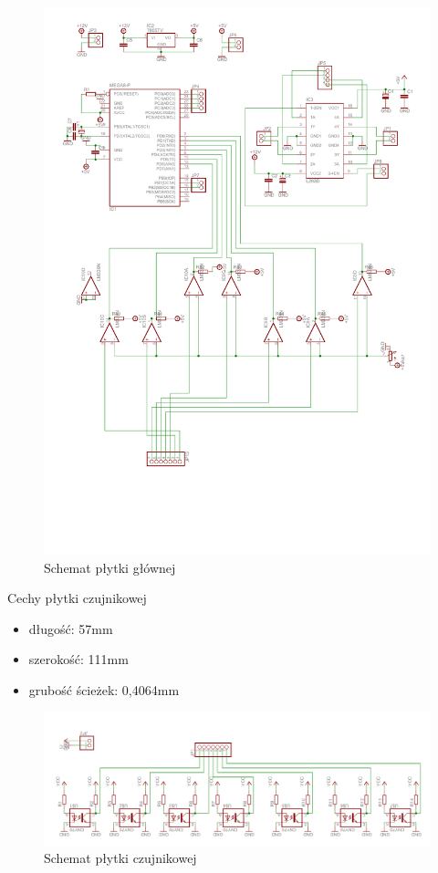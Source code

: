 \documentclass[11pt,a4paper]{article}
\begin{document}
  \begin{figure}[H]
  \includegraphics[scale=0.8]{schemat_glowna}
  \caption{Schemat płytki głównej}
\end{figure}

  Cechy płytki czujnikowej
  \begin{itemize}
    \item długość: 57mm
    \item szerokość: 111mm
    \item grubość ścieżek: 0,4064mm
  \end{itemize}

  \begin{figure}[H]
  \includegraphics[scale=0.38, angle=180]{schemat_czujniki}
  \caption{Schemat płytki czujnikowej}
\end{figure}
\end{document}
